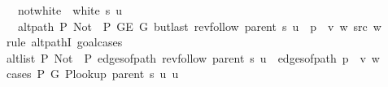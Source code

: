 \begin{isabellebody}
\ \ \ not{\isacharunderscore}{\kern0pt}white{\isacharcolon}{\kern0pt}\ {\isachardoublequoteopen}{\isasymnot}\ white\ s\ u{\isachardoublequoteclose}\isanewline
\ \ \ {\isachardoublequoteopen}alt{\isacharunderscore}{\kern0pt}path\ P{\isacharprime}{\kern0pt}{\isacharprime}{\kern0pt}\ {\isacharparenleft}{\kern0pt}Not\ {\isasymcirc}\ P{\isacharprime}{\kern0pt}{\isacharprime}{\kern0pt}{\isacharparenright}{\kern0pt}\ {\isacharparenleft}{\kern0pt}G{\isachardot}{\kern0pt}E\ G{\isacharparenright}{\kern0pt}\ {\isacharparenleft}{\kern0pt}butlast\ {\isacharparenleft}{\kern0pt}rev{\isacharunderscore}{\kern0pt}follow\ {\isacharparenleft}{\kern0pt}parent\ s{\isacharparenright}{\kern0pt}\ u{\isacharparenright}{\kern0pt}\ {\isacharat}{\kern0pt}\ p\ {\isacharat}{\kern0pt}\ {\isacharbrackleft}{\kern0pt}v{\isacharcomma}{\kern0pt}\ w{\isacharbrackright}{\kern0pt}{\isacharparenright}{\kern0pt}\ src\ w{\isachardoublequoteclose}\isanewline
%
\isadelimproof
%
\endisadelimproof
%
\isatagproof
{}\isamarkupfalse%
\ {\isacharparenleft}{\kern0pt}rule\ alt{\isacharunderscore}{\kern0pt}pathI{\isacharcomma}{\kern0pt}\ goal{\isacharunderscore}{\kern0pt}cases{\isacharparenright}{\kern0pt}\isanewline
\ \ \isamarkupfalse%
\ {}\isanewline
\ \ \isamarkupfalse%
\ {\isachardoublequoteopen}alt{\isacharunderscore}{\kern0pt}list\ P{\isacharprime}{\kern0pt}{\isacharprime}{\kern0pt}\ {\isacharparenleft}{\kern0pt}Not\ {\isasymcirc}\ P{\isacharprime}{\kern0pt}{\isacharprime}{\kern0pt}{\isacharparenright}{\kern0pt}\ {\isacharparenleft}{\kern0pt}edges{\isacharunderscore}{\kern0pt}of{\isacharunderscore}{\kern0pt}path\ {\isacharparenleft}{\kern0pt}rev{\isacharunderscore}{\kern0pt}follow\ {\isacharparenleft}{\kern0pt}parent\ s{\isacharparenright}{\kern0pt}\ u{\isacharparenright}{\kern0pt}\ {\isacharat}{\kern0pt}\ edges{\isacharunderscore}{\kern0pt}of{\isacharunderscore}{\kern0pt}path\ {\isacharparenleft}{\kern0pt}p\ {\isacharat}{\kern0pt}\ {\isacharbrackleft}{\kern0pt}v{\isacharcomma}{\kern0pt}\ w{\isacharbrackright}{\kern0pt}{\isacharparenright}{\kern0pt}{\isacharparenright}{\kern0pt}{\isachardoublequoteclose}\isanewline
\ \ \isamarkupfalse%
\ {\isacharparenleft}{\kern0pt}cases\ {\isachardoublequoteopen}P{\isacharprime}{\kern0pt}\ G{}\ {\isacharparenleft}{\kern0pt}P{\isacharunderscore}{\kern0pt}lookup\ {\isacharparenleft}{\kern0pt}parent\ s{\isacharparenright}{\kern0pt}\ u{\isacharparenright}{\kern0pt}\ u{\isachardoublequoteclose}{\isacharparenright}{\kern0pt}\isanewline
\ \ \ \ \isamarkupfalse%

\end{isabellebody}
